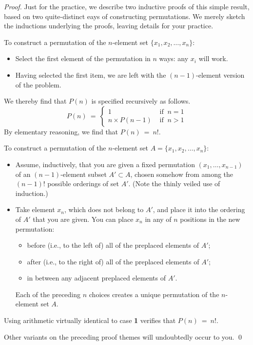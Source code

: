 \begin{proof}
Just for the practice, we describe two inductive proofs of this simple result, based on two
quite-distinct eays of constructing permutations.  We merely
sketch the inductions underlying the proofs, leaving details for your practice.

\medskip

To construct a permutation of the $n$-element set $\{ x_1, x_2, \ldots , x_n\}$:
\begin{itemize}
\item
Select the first element of the permutation in $n$ ways: any $x_i$ will work.
\item
Having selected the first item, we are left with the $(n-1)$-element version of the problem.
\end{itemize}
We thereby find that $P(n)$ is specified recursively as follows.
\[
P(n) \ = \ \left\{
\begin{array}{cl}
1 & \mbox{ if } \ n=1 \\
n \times P(n-1) & \mbox{ if } \ n>1
\end{array}
\right.
\]
By elementary reasoning, we find that $P(n) \ = \ n!$.

\bigskip

To construct a permutation of the $n$-element set $A = \{ x_1, x_2, \ldots , x_n\}$:
\begin{itemize}
\item
Assume, inductively, that you are given a fixed 
permutation $(x_1, \ldots , x_{n-1})$ of an $(n-1)$-element subset $A'  \subset A$,
chosen somehow from among the $(n-1)!$ possible orderings of set $A'$.  (Note
the thinly veiled use of induction.)
\item
Take element $x_n$, which does not belong to $A'$, and place it into the ordering of $A'$
that you are given.  You can place $x_n$ in any of $n$ positions in the new permutation:
  \begin{itemize}
  \item
before (i.e., to the left of) all of the preplaced elements of $A'$;
  \item
after (i.e., to the right of) all of the preplaced elements of $A'$;
  \item
in between any adjacent preplaced elements of $A'$.
  \end{itemize}
Each of the preceding $n$ choices creates a unique permutation of the $n$-element set $A$.
\end{itemize}
Using arithmetic virtually identical to case {\bf 1} verifies that $P(n) \ = \ n!$.

\medskip

\noindent
Other variants on the preceding proof themes will undoubtedly occur to you.   \qed
\end{proof}


